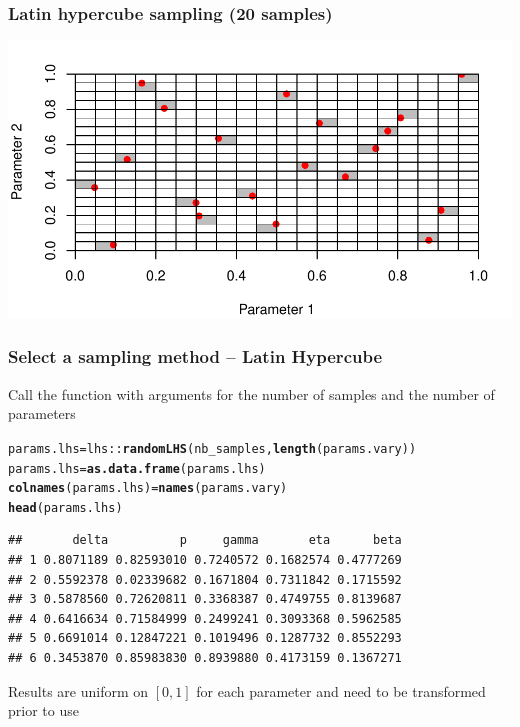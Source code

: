 \documentclass[aspectratio=169]{beamer}\usepackage[]{graphicx}\usepackage[]{xcolor}
\makeatletter
\def\maxwidth{ %
  \ifdim\Gin@nat@width>\linewidth
    \linewidth
  \else
    \Gin@nat@width
  \fi
}
\newcommand{\hlopt}[1]{\textcolor[rgb]{0,0,0}{#1}}%
\newcommand{\hldef}[1]{\textcolor[rgb]{0.345,0.345,0.345}{#1}}%
\newcommand{\hlkwb}[1]{\textcolor[rgb]{0.69,0.353,0.396}{#1}}%
\newcommand{\hlkwd}[1]{\textcolor[rgb]{0.737,0.353,0.396}{\textbf{#1}}}%
\newenvironment{kframe}{%
 \def\at@end@of@kframe{}%
 \ifinner\ifhmode%
  \def\at@end@of@kframe{\end{minipage}}%
  \begin{minipage}{\columnwidth}%
 \fi\fi%
 \def\FrameCommand##1{\hskip\@totalleftmargin \hskip-\fboxsep
 \colorbox{shadecolor}{##1}\hskip-\fboxsep
     \hskip-\linewidth \hskip-\@totalleftmargin \hskip\columnwidth}%
 \MakeFramed {\advance\hsize-\width
   \@totalleftmargin\z@ \linewidth\hsize
   \@setminipage}}%
 {\par\unskip\endMakeFramed%
 \at@end@of@kframe}
\newenvironment{knitrout}{}{} %
\makeatother
\begin{document}
\begin{frame}[fragile]\frametitle{Latin hypercube sampling (20 samples)}
\begin{knitrout}
\color{fgcolor}
\includegraphics[width=\maxwidth]{FIGS/comp-analysis-lhs-sampling-2d-example-1} 
\end{knitrout}
\end{frame}

\begin{frame}[fragile]\frametitle{Select a sampling method -- Latin Hypercube}
Call the function with arguments for the number of samples and the number of parameters
\begin{knitrout}
\color{fgcolor}\begin{kframe}
\begin{alltt}
\hldef{params.lhs} \hlkwb{=} \hldef{lhs}\hlopt{::}\hlkwd{randomLHS}\hldef{(nb_samples,} \hlkwd{length}\hldef{(params.vary))}
\hldef{params.lhs} \hlkwb{=} \hlkwd{as.data.frame}\hldef{(params.lhs)}
\hlkwd{colnames}\hldef{(params.lhs)} \hlkwb{=} \hlkwd{names}\hldef{(params.vary)}
\hlkwd{head}\hldef{(params.lhs)}
\end{alltt}
\begin{verbatim}
##       delta          p     gamma       eta      beta
## 1 0.8071189 0.82593010 0.7240572 0.1682574 0.4777269
## 2 0.5592378 0.02339682 0.1671804 0.7311842 0.1715592
## 3 0.5878560 0.72620811 0.3368387 0.4749755 0.8139687
## 4 0.6416634 0.71584999 0.2499241 0.3093368 0.5962585
## 5 0.6691014 0.12847221 0.1019496 0.1287732 0.8552293
## 6 0.3453870 0.85983830 0.8939880 0.4173159 0.1367271
\end{verbatim}
\end{kframe}
\end{knitrout}
\vfill
Results are uniform on $[0,1]$ for each parameter and need to be transformed prior to use
\end{frame}
\end{document}
